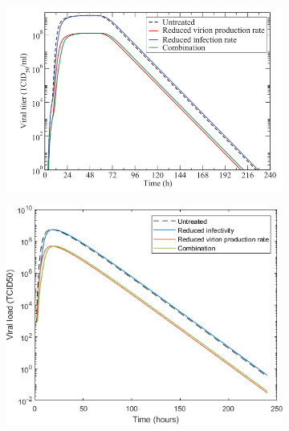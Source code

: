 \documentclass[a4paper,11pt]{article}
\begin{document}
\begin{figure}[ht]
    \centering
    \begin{subfigure}{0.4\textwidth}
    
    \includegraphics[width=\textwidth]{treatm10.png}
    \end{subfigure}
    \begin{subfigure}{0.35\textwidth}
    
    \includegraphics[width=\textwidth]{treat10.png}
    \end{subfigure}
    
    \begin{subfigure}{0.4\textwidth}
    

\end{subfigure}
\end{figure}
\end{document}
